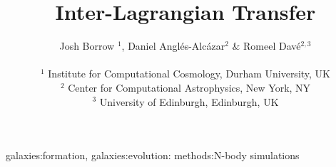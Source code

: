 \documentclass[fleqn,usenatbib]{mnras}
\title{Inter-Lagrangian Transfer}
\author[Borrow et al.]{
Josh Borrow $^{1}$,
Daniel Angl\'es-Alc\'azar$^{2}$ \&
Romeel Dav\'e$^{2, 3}$
\\
\\$^1$ Institute for Computational Cosmology, Durham University, UK
\\$^2$ Center for Computational Astrophysics, New York, NY
\\$^3$ University of Edinburgh, Edinburgh, UK
}
\begin{document}
\maketitle

\begin{abstract}\end{abstract}

\begin{keywords}galaxies:formation, galaxies:evolution: methods:N-body simulations\end{keywords}






%







\end{document}
